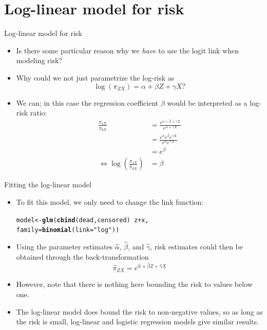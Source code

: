 \documentclass[10pt]{beamer}\usepackage[]{graphicx}\usepackage[]{color}
\makeatletter
\newcommand{\hlstr}[1]{\textcolor[rgb]{0.192,0.494,0.8}{#1}}%
\newcommand{\hlopt}[1]{\textcolor[rgb]{0,0,0}{#1}}%
\newcommand{\hlstd}[1]{\textcolor[rgb]{0.345,0.345,0.345}{#1}}%
\newcommand{\hlkwb}[1]{\textcolor[rgb]{0.69,0.353,0.396}{#1}}%
\newcommand{\hlkwc}[1]{\textcolor[rgb]{0.333,0.667,0.333}{#1}}%
\newcommand{\hlkwd}[1]{\textcolor[rgb]{0.737,0.353,0.396}{\textbf{#1}}}%
\newenvironment{kframe}{%
 \def\at@end@of@kframe{}%
 \ifinner\ifhmode%
  \def\at@end@of@kframe{\end{minipage}}%
  \begin{minipage}{\columnwidth}%
 \fi\fi%
 \def\FrameCommand##1{\hskip\@totalleftmargin \hskip-\fboxsep
 \colorbox{shadecolor}{##1}\hskip-\fboxsep
     \hskip-\linewidth \hskip-\@totalleftmargin \hskip\columnwidth}%
 \MakeFramed {\advance\hsize-\width
   \@totalleftmargin\z@ \linewidth\hsize
   \@setminipage}}%
 {\par\unskip\endMakeFramed%
 \at@end@of@kframe}
\newenvironment{knitrout}{}{} %
\makeatother
\begin{document}
\section{Log-linear model for risk}

\begin{frame}[fragile]{Log-linear model for risk}
	\begin{itemize}
		\item Is there some particular reason why we \textit{have} to use the logit link when modeling risk?
		\item Why could we not just parametrize the log-risk as
		$$
		\log(\pi_{ZX}) = \alpha + \beta Z + \gamma X ?
		$$
		\pause 
		\item We can; in this case the regression coefficient $\beta$ would be interpreted as a log-risk ratio:
$$\begin{aligned}
	\frac{\pi_{1 X}}{\pi_{0 X}} &=\frac{e^{\alpha+\beta+\gamma X}}{e^{\alpha+\gamma X}} \\
	&=\frac{e^{\alpha} e^{\beta} e^{\gamma X}}{e^{\alpha} e^{\gamma X}} \\
	&=e^{\beta} \\
	\Leftrightarrow \log \left(\frac{\pi_{1 X}}{\pi_{0 X}}\right) &=\beta
\end{aligned}$$
	\end{itemize}
\end{frame}




\begin{frame}[fragile]{Fitting the log-linear model}
\begin{itemize}
	\item To fit this model, we only need to change the link
	function:
\begin{knitrout}
\color{fgcolor}\begin{kframe}
\begin{alltt}
        \hlstd{model} \hlkwb{<-} \hlkwd{glm}\hlstd{(}\hlkwd{cbind}\hlstd{(dead,censored)} \hlopt{~} \hlstd{z} \hlopt{+} \hlstd{x,}
                     \hlkwc{family}\hlstd{=}\hlkwd{binomial}\hlstd{(}\hlkwc{link}\hlstd{=}\hlstr{"log"}\hlstd{))}
\end{alltt}
\end{kframe}
\end{knitrout}
	\item Using the parameter estimates $\hat{\alpha}$, $\hat{\beta}$, and $\hat{\gamma}$, risk estimates could then be obtained through the back-transformation
	$$
	\hat{\pi}_{ZX} = e^{\hat{\alpha} + \hat{\beta} Z + \hat{\gamma} X}
	$$
	\item However, note that there is nothing here bounding the risk
	to values below one.
	\item The log-linear model does bound the risk to non-negative
	values, so as long as the risk is small, log-linear and
	logistic regression models give similar results.
\end{itemize}
\end{frame}
\end{document}

